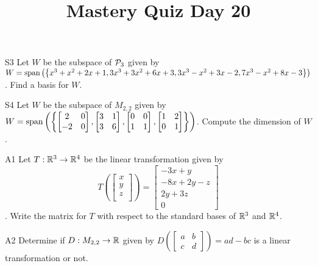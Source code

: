 \documentclass{sbgLAquiz}
\title{Mastery Quiz Day 20 }
\begin{document}
\begin{problem}{S3}
Let $W$ be the subspace of $\P_3$ given by $W = {\rm span} \left( \left\{ x^3+x^2+2x+1, 3x^3+3x^2+6x+3, 3x^3-x^2+3x-2, 7x^3-x^2+8x-3 \right\} \right)$.  Find a basis for $W$.
\end{problem}

\begin{problem}{S4}
Let $W$ be the subspace of $M_{2,2}$ given by $W={\rm span}\left(\left\{\begin{bmatrix} 2 & 0 \\ -2 & 0 \end{bmatrix}, \begin{bmatrix} 3 & 1 \\ 3 & 6 \end{bmatrix}, \begin{bmatrix} 0 & 0 \\ 1 & 1 \end{bmatrix}, \begin{bmatrix}1 & 2 \\ 0 & 1 \end{bmatrix}\right\}\right)$. Compute the dimension of $W$.
\end{problem}
\newpage

\begin{problem}{A1}
Let $T: \IR^3\rightarrow \IR^4$ be the linear transformation given by $$T\left(\begin{bmatrix} x \\ y \\ z \\  \end{bmatrix} \right) = \begin{bmatrix} -3x+y \\ -8x+2y-z \\ 2y+3z \\ 0 \end{bmatrix}$$.  Write the matrix for $T$ with respect to the standard bases of $\IR^3$ and $\IR^4$.
\end{problem}

\begin{problem}{A2}
Determine if $D: M_{2,2} \rightarrow \IR$ given by $D\left(\begin{bmatrix} a & b \\ c & d \end{bmatrix} \right) = ad-bc$ is a linear transformation or not.
\end{problem}
\end{document}
